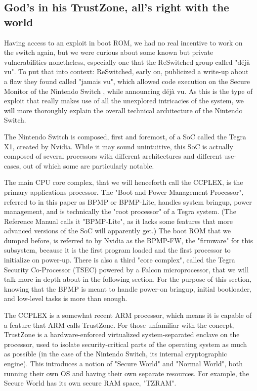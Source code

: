 \documentclass[journal]{IEEEtran}
\begin{document}
\subsection{God's in his TrustZone, all's right with the world}

Having access to an exploit in boot ROM, we had no real incentive to work on the switch again, but
we were curious about some known but private vulnerabilities nonetheless, especially one that the
ReSwitched group called "déjà vu". To put that into context: ReSwitched, early on, publicized a
write-up about a flaw they found called "jamais vu", which allowed code execution on the Secure
Monitor of the Nintendo Switch \cite{jamais_vu}, while announcing déjà vu. As this is the type of
exploit that really makes use of all the unexplored intricacies of the system, we will more
thoroughly explain the overall technical architecture of the Nintendo Switch.

The Nintendo Switch is composed, first and foremost, of a SoC called the Tegra X1, created by
Nvidia. While it may sound unintuitive, this SoC is actually composed of several processors with
different architectures and different use-cases, out of which some are particularly notable.

The main CPU core complex, that we will henceforth call the CCPLEX, is the primary applications
processor. The "Boot and Power Management Processor", referred to in this paper as BPMP or
BPMP-Lite, handles system bringup, power management, and is technically the "root processor" of a
Tegra system. (The Reference Manual calls it "BPMP-Lite", as it lacks some features that more
advanced versions of the SoC will apparently get.) The boot ROM that we dumped before, is referred
to by Nvidia as the BPMP-FW, the "firmware" for this subsystem, because it is the first program
loaded and the first processor to initialize on power-up.
There is also a third "core complex", called the Tegra Security 
Co-Processor (TSEC) powered by a Falcon microprocessor, that we will talk more in depth about in the following section. 
For the purpose of this section, knowing that the BPMP is
meant to handle power-on bringup, initial bootloader, and low-level tasks is more than enough.

The CCPLEX is a somewhat recent ARM processor, which means it is capable of a feature that ARM
calls TrustZone. For those unfamiliar with the concept, TrustZone is a hardware-enforced virtualized
system-separated enclave on the processor, used to isolate security-critical parts of the operating
system as much as possible (in the case of the Nintendo Switch, its internal cryptographic engine).
This introduces a notion of "Secure World" and "Normal World", both running their own OS and having
their own separate resources. For example, the Secure World has its own secure RAM space, "TZRAM".
\end{document}
